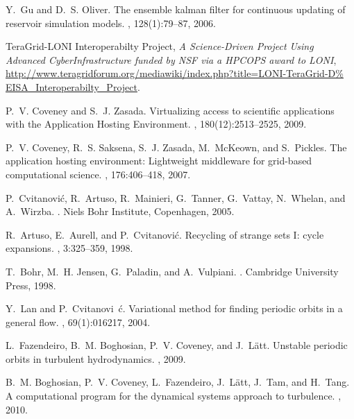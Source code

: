 \begin{thebibliography}{10}
Y.~Gu and D.~S. Oliver.
\newblock The ensemble kalman filter for continuous updating of reservoir
  simulation models.
, 128(1):79--87,
  2006.

TeraGrid-LONI Interoperabilty Project, {\it A Science-Driven Project Using
  Advanced CyberInfrastructure funded by NSF via a HPCOPS award to LONI},
  {\url{http://www.teragridforum.org/mediawiki/index.php?title=LONI-TeraGrid-D%
EISA\_Interoperabilty\_Project}}.


P.~V. Coveney and S.~J. Zasada.
\newblock Virtualizing access to scientific applications with the {Application
  Hosting Environment}.
, 180(12):2513--2525, 2009.

P.~V. Coveney, R.~S. Saksena, S.~J. Zasada, M.~McKeown, and S.~Pickles.
\newblock The application hosting environment: Lightweight middleware for
  grid-based computational science.
, 176:406--418, 2007.

P.~Cvitanovi{\'{c}}, R.~Artuso, R.~Mainieri, G.~Tanner, G.~Vattay, N.~Whelan,
  and A.~Wirzba.
.
\newblock Niels Bohr Institute, Copenhagen, 2005.

R.~Artuso, E.~Aurell, and P.~Cvitanovi{\'{c}}.
\newblock Recycling of strange sets \uppercase{i}: cycle expansions.
, 3:325--359, 1998.

T.~Bohr, M.~H. Jensen, G.~Paladin, and A.~Vulpiani.
.
\newblock Cambridge University Press, 1998.

Y.~Lan and P.~Cvitanovi\ifmmode~\else \'{c}\fi{}.
\newblock Variational method for finding periodic orbits in a general flow.
, 69(1):016217, 2004.

L.~Fazendeiro, B.~M. Boghosian, P.~V. Coveney, and J.~L{\"{a}}tt.
\newblock Unstable periodic orbits in turbulent hydrodynamics.
, 2009.

B.~M. Boghosian, P.~V. Coveney, L.~Fazendeiro, J.~L{\"{a}}tt, J.~Tam, and
  H.~Tang.
\newblock A computational program for the dynamical systems approach to
  turbulence.
, 2010.


\end{thebibliography}
